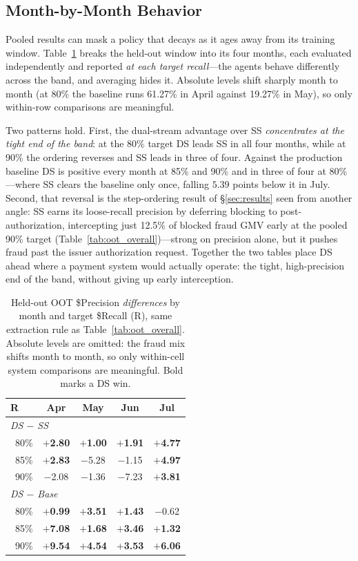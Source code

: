 \documentclass[11pt]{article}
\begin{document}
\subsection{Month-by-Month Behavior}
\label{sec:monthly}
Pooled results can mask a policy that decays as it ages away from its training window.
Table~\ref{tab:oot_month} breaks the held-out window into its four months, each evaluated
independently and reported \emph{at each target recall}---the agents behave differently across the
band, and averaging hides it. Absolute levels shift sharply month to month (at 80\% the baseline
runs 61.27\% in April against 19.27\% in May), so only within-row comparisons are meaningful.

Two patterns hold. First, the dual-stream advantage over SS \emph{concentrates at the tight end of
the band}: at the 80\% target DS leads SS in all four months, while at 90\% the ordering reverses
and SS leads in three of four. Against the production baseline DS is positive every month at 85\%
and 90\% and in three of four at 80\%---where SS clears the baseline only once, falling $5.39$
points below it in July. Second, that reversal is the step-ordering result of \S\ref{sec:results}
seen from another angle: SS earns its loose-recall precision by deferring blocking to
post-authorization, intercepting just 12.5\% of blocked fraud GMV early at the pooled 90\% target
(Table~\ref{tab:oot_overall})---strong on precision alone, but it pushes fraud past the issuer
authorization request. Together the two tables place DS ahead where a payment system would actually
operate: the tight, high-precision end of the band, without giving up early interception.

\begin{table}[t]
\footnotesize
\centering
\setlength{\tabcolsep}{4pt}
\caption{Held-out OOT \$Precision \emph{differences} by month and target \$Recall (R), same
extraction rule as Table~\ref{tab:oot_overall}. Absolute levels are omitted: the fraud mix shifts
month to month, so only within-cell system comparisons are meaningful. Bold marks a DS win.}
\label{tab:oot_month}
\begin{tabular}{lcccc}
\toprule
R & Apr & May & Jun & Jul \\
\midrule
\multicolumn{5}{l}{\textit{DS $-$ SS}}\\
~80\% & \textbf{$+$2.80} & \textbf{$+$1.00} & \textbf{$+$1.91} & \textbf{$+$4.77} \\
~85\% & \textbf{$+$2.83} & $-$5.28 & $-$1.15 & \textbf{$+$4.97} \\
~90\% & $-$2.08 & $-$1.36 & $-$7.23 & \textbf{$+$3.81} \\
\midrule
\multicolumn{5}{l}{\textit{DS $-$ Base}}\\
~80\% & \textbf{$+$0.99} & \textbf{$+$3.51} & \textbf{$+$1.43} & $-$0.62 \\
~85\% & \textbf{$+$7.08} & \textbf{$+$1.68} & \textbf{$+$3.46} & \textbf{$+$1.32} \\
~90\% & \textbf{$+$9.54} & \textbf{$+$4.54} & \textbf{$+$3.53} & \textbf{$+$6.06} \\
\bottomrule
\end{tabular}
\end{table}
\end{document}
